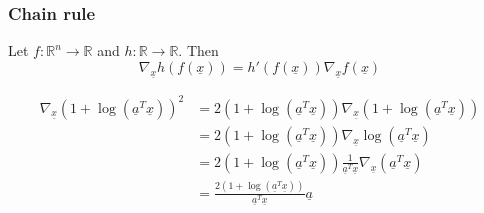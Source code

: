     \subsubsection{Chain rule}
    \begin{definition}
        Let \( f: \mathbb{R}^n \to \mathbb{R} \) and \( h: \mathbb{R} \to \mathbb{R} \). Then
        \[
        \nabla_{\underline{x}} h(f(\underline{x})) = h'(f(\underline{x})) \nabla_{\underline{x}} f(\underline{x})
        \]
    \end{definition}

    \begin{example}
        \begin{align*}
            \nabla_{\underline{x}} \left( 1 + \log(\underline{a}^T \underline{x}) \right)^2 &= 2 \left( 1 + \log(\underline{a}^T \underline{x}) \right) \nabla_{\underline{x}} \left( 1 + \log(\underline{a}^T \underline{x}) \right) \\
            &= 2 \left( 1 + \log(\underline{a}^T \underline{x}) \right) \nabla_{\underline{x}} \log(\underline{a}^T \underline{x}) \\
            &= 2 \left( 1 + \log(\underline{a}^T \underline{x}) \right) \frac{1}{\underline{a}^T \underline{x}} \nabla_{\underline{x}}  (\underline{a}^T \underline{x}) \\
            &= \frac{2 \left( 1 + \log(\underline{a}^T \underline{x}) \right)}{\underline{a}^T \underline{x}} \underline{a} 
        \end{align*}
    \end{example}

